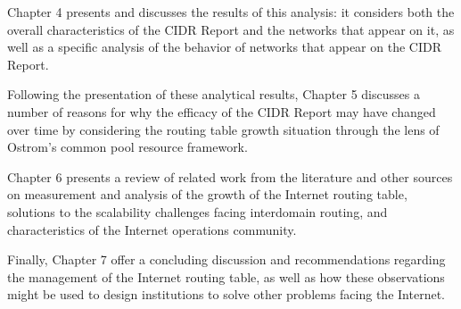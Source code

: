 Chapter 4 presents and discusses the results of this analysis: it considers both the overall characteristics of the CIDR Report and the networks that appear on it, as well as a specific analysis of the behavior of networks that appear on the CIDR Report. 

Following the presentation of these analytical results, Chapter 5 discusses a number of reasons for why the efficacy of the CIDR Report may have changed over time by considering the routing table growth situation through the lens of Ostrom's common pool resource framework.

Chapter 6 presents a review of related work from the literature and other sources on measurement and analysis of the growth of the Internet routing table, solutions to the scalability challenges facing interdomain routing, and characteristics of the Internet operations community.

Finally, Chapter 7 offer a concluding discussion and recommendations regarding the management of the Internet routing table, as well as how these observations might be used to design institutions to solve other problems facing the Internet.